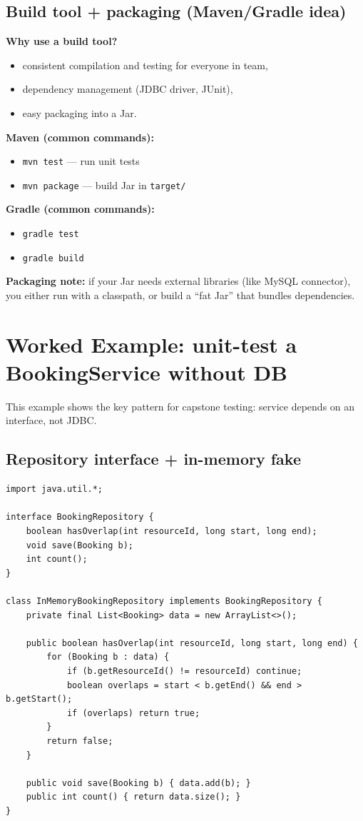 \documentclass[11pt]{article}
\begin{document}
\subsection{Build tool + packaging (Maven/Gradle idea)}
\textbf{Why use a build tool?}
\begin{itemize}
  \item consistent compilation and testing for everyone in team,
  \item dependency management (JDBC driver, JUnit),
  \item easy packaging into a Jar.
\end{itemize}

\textbf{Maven (common commands):}
\begin{itemize}
  \item \texttt{mvn test} --- run unit tests
  \item \texttt{mvn package} --- build Jar in \texttt{target/}
\end{itemize}

\textbf{Gradle (common commands):}
\begin{itemize}
  \item \texttt{gradle test}
  \item \texttt{gradle build}
\end{itemize}

\textbf{Packaging note:} if your Jar needs external libraries (like MySQL connector),
you either run with a classpath, or build a ``fat Jar'' that bundles dependencies.

\notesources{\OOPSUnitVISources}

\section{Worked Example: unit-test a BookingService without DB}
This example shows the key pattern for capstone testing: service depends on an interface, not JDBC.

\subsection{Repository interface + in-memory fake}
\begin{lstlisting}
import java.util.*;

interface BookingRepository {
    boolean hasOverlap(int resourceId, long start, long end);
    void save(Booking b);
    int count();
}

class InMemoryBookingRepository implements BookingRepository {
    private final List<Booking> data = new ArrayList<>();

    public boolean hasOverlap(int resourceId, long start, long end) {
        for (Booking b : data) {
            if (b.getResourceId() != resourceId) continue;
            boolean overlaps = start < b.getEnd() && end > b.getStart();
            if (overlaps) return true;
        }
        return false;
    }

    public void save(Booking b) { data.add(b); }
    public int count() { return data.size(); }
}
\end{lstlisting}
\end{document}
